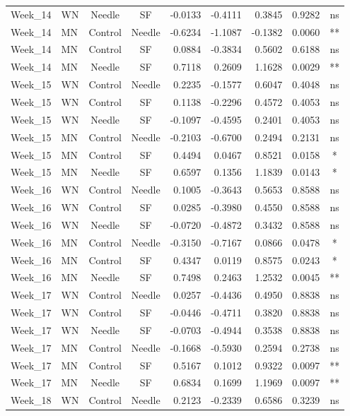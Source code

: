 \documentclass[
  12pt,
  letterpaper,
]{article}
\begin{document}
\begin{longtable}{llccrrrlc}
Week\_14 & WN & Needle & SF & -0.0133 & -0.4111 & 0.3845 & 0.9282 & ns \\ 
Week\_14 & MN & Control & Needle & -0.6234 & -1.1087 & -0.1382 & 0.0060 & ** \\ 
Week\_14 & MN & Control & SF & 0.0884 & -0.3834 & 0.5602 & 0.6188 & ns \\ 
Week\_14 & MN & Needle & SF & 0.7118 & 0.2609 & 1.1628 & 0.0029 & ** \\ 
Week\_15 & WN & Control & Needle & 0.2235 & -0.1577 & 0.6047 & 0.4048 & ns \\ 
Week\_15 & WN & Control & SF & 0.1138 & -0.2296 & 0.4572 & 0.4053 & ns \\ 
Week\_15 & WN & Needle & SF & -0.1097 & -0.4595 & 0.2401 & 0.4053 & ns \\ 
Week\_15 & MN & Control & Needle & -0.2103 & -0.6700 & 0.2494 & 0.2131 & ns \\ 
Week\_15 & MN & Control & SF & 0.4494 & 0.0467 & 0.8521 & 0.0158 & * \\ 
Week\_15 & MN & Needle & SF & 0.6597 & 0.1356 & 1.1839 & 0.0143 & * \\ 
Week\_16 & WN & Control & Needle & 0.1005 & -0.3643 & 0.5653 & 0.8588 & ns \\ 
Week\_16 & WN & Control & SF & 0.0285 & -0.3980 & 0.4550 & 0.8588 & ns \\ 
Week\_16 & WN & Needle & SF & -0.0720 & -0.4872 & 0.3432 & 0.8588 & ns \\ 
Week\_16 & MN & Control & Needle & -0.3150 & -0.7167 & 0.0866 & 0.0478 & * \\ 
Week\_16 & MN & Control & SF & 0.4347 & 0.0119 & 0.8575 & 0.0243 & * \\ 
Week\_16 & MN & Needle & SF & 0.7498 & 0.2463 & 1.2532 & 0.0045 & ** \\ 
Week\_17 & WN & Control & Needle & 0.0257 & -0.4436 & 0.4950 & 0.8838 & ns \\ 
Week\_17 & WN & Control & SF & -0.0446 & -0.4711 & 0.3820 & 0.8838 & ns \\ 
Week\_17 & WN & Needle & SF & -0.0703 & -0.4944 & 0.3538 & 0.8838 & ns \\ 
Week\_17 & MN & Control & Needle & -0.1668 & -0.5930 & 0.2594 & 0.2738 & ns \\ 
Week\_17 & MN & Control & SF & 0.5167 & 0.1012 & 0.9322 & 0.0097 & ** \\ 
Week\_17 & MN & Needle & SF & 0.6834 & 0.1699 & 1.1969 & 0.0097 & ** \\ 
Week\_18 & WN & Control & Needle & 0.2123 & -0.2339 & 0.6586 & 0.3239 & ns \\ 

\end{longtable}
\end{document}

